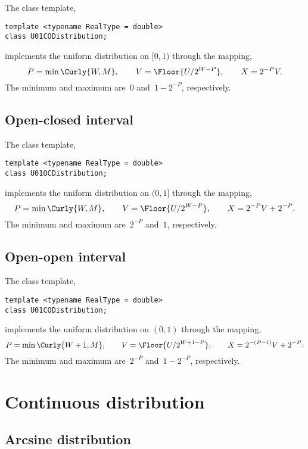 The class template,
\begin{verbatim}
template <typename RealType = double>
class U01CODistribution;
\end{verbatim}
implements the uniform distribution on $[0, 1)$ through the mapping,
\begin{equation*}
  P = \min\Curly{W, M},\qquad
  V = \Floor{U / 2^{W - P}},\qquad
  X = 2^{-P} V.
\end{equation*}
The minimum and maximum are~$0$ and~$1 - 2^{-P}$, respectively.

\subsection{Open-closed interval}
\label{sub:Open-closed interval}

The class template,
\begin{verbatim}
template <typename RealType = double>
class U01OCDistribution;
\end{verbatim}
implements the uniform distribution on $(0, 1]$ through the mapping,
\begin{equation*}
  P = \min\Curly{W, M},\qquad
  V = \Floor{U / 2^{W - P}},\qquad
  X = 2^{-P} V + 2^{-P}.
\end{equation*}
The minimum and maximum are~$2^{-P}$ and~$1$, respectively.

\subsection{Open-open interval}
\label{sub:Open-open interval}

The class template,
\begin{verbatim}
template <typename RealType = double>
class U01CODistribution;
\end{verbatim}
implements the uniform distribution on $(0, 1)$ through the mapping,
\begin{equation*}
  P = \min\Curly{W + 1, M},\qquad
  V = \Floor{U / 2^{W + 1 - P}},\qquad
  X = 2^{-(P - 1)} V + 2^{-P}.
\end{equation*}
The minimum and maximum are~$2^{-P}$ and~$1 - 2^{-P}$, respectively.

\section{Continuous distribution}
\label{sec:Continuous distribution}

\subsection{Arcsine distribution}
\label{sub:Arcsine distribution}

